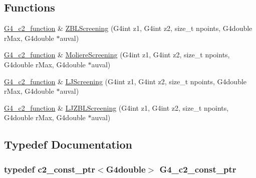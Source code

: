 \subsection*{Functions}
\begin{DoxyCompactItemize}
\item 
\hyperlink{G4ScreenedNuclearRecoil_8hh_a679aa602c6cfde1625601e0314b3cc01}{G4\+\_\+c2\+\_\+function} \& \hyperlink{G4ScreenedNuclearRecoil_8hh_a38390a6f2bb8ba250affdccb1c9cc49c}{Z\+B\+L\+Screening} (G4int z1, G4int z2, size\+\_\+t npoints, G4double r\+Max, G4double $\ast$auval)
\item 
\hyperlink{G4ScreenedNuclearRecoil_8hh_a679aa602c6cfde1625601e0314b3cc01}{G4\+\_\+c2\+\_\+function} \& \hyperlink{G4ScreenedNuclearRecoil_8hh_af83b8ddfa7c0df319b4573c74bb4afd3}{Moliere\+Screening} (G4int z1, G4int z2, size\+\_\+t npoints, G4double r\+Max, G4double $\ast$auval)
\item 
\hyperlink{G4ScreenedNuclearRecoil_8hh_a679aa602c6cfde1625601e0314b3cc01}{G4\+\_\+c2\+\_\+function} \& \hyperlink{G4ScreenedNuclearRecoil_8hh_afab442d2da9f659d2c7d4b9bb1e64f5e}{L\+J\+Screening} (G4int z1, G4int z2, size\+\_\+t npoints, G4double r\+Max, G4double $\ast$auval)
\item 
\hyperlink{G4ScreenedNuclearRecoil_8hh_a679aa602c6cfde1625601e0314b3cc01}{G4\+\_\+c2\+\_\+function} \& \hyperlink{G4ScreenedNuclearRecoil_8hh_a1e2dbe4b8a87ad052a14e6c21ad98cbf}{L\+J\+Z\+B\+L\+Screening} (G4int z1, G4int z2, size\+\_\+t npoints, G4double r\+Max, G4double $\ast$auval)
\end{DoxyCompactItemize}


\subsection{Typedef Documentation}
\subsubsection[{\texorpdfstring{G4\+\_\+c2\+\_\+const\+\_\+ptr}{G4_c2_const_ptr}}]{\setlength{\rightskip}{0pt plus 5cm}typedef {\bf c2\+\_\+const\+\_\+ptr}$<$G4double$>$ {\bf G4\+\_\+c2\+\_\+const\+\_\+ptr}}\hypertarget{G4ScreenedNuclearRecoil_8hh_a1252ac0bd90119ed9cc3298296b77c2a}{}\label{G4ScreenedNuclearRecoil_8hh_a1252ac0bd90119ed9cc3298296b77c2a}
